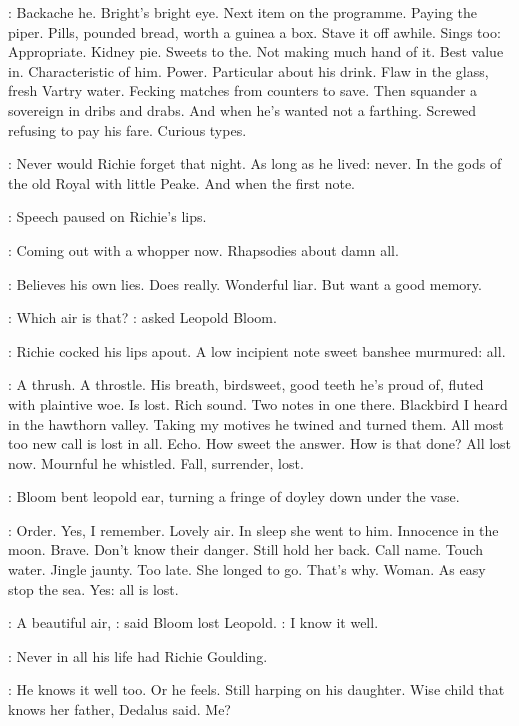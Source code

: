 \BloomInt:
Backache he.
Bright's bright eye.
Next item on the programme.
Paying the
piper.
Pills,
pounded bread,
worth a guinea a box.
Stave it off awhile.
Sings too:
Appropriate.
Kidney pie.
Sweets to
the.
Not making much hand of it.
Best value in.
Characteristic of him.
Power.
Particular about his drink.
Flaw in the glass,
fresh Vartry water.
Fecking matches from counters to save.
Then squander a sovereign in dribs
and drabs.
And when he's wanted not a farthing.
Screwed refusing to pay
his fare.
Curious types.

:
Never would Richie forget that night.
As long as he lived:
never.
In
the gods of the old Royal with little Peake.
And when the first note.

:
Speech paused on Richie's lips.

\BloomInt:
Coming out with a whopper now.
Rhapsodies about damn all.

\BloomInt:
Believes his own lies.
Does really.
Wonderful liar.
But want a good memory.

\Bloom:
Which air is that?
:
asked Leopold Bloom.


:
Richie cocked his lips apout.
A low incipient note sweet banshee murmured:
all.

\BloomInt:
A thrush.
A throstle.
His breath,
birdsweet,
good teeth he's proud of,
fluted with plaintive woe.
Is lost.
Rich sound.
Two notes in one there.
Blackbird I heard in the hawthorn valley.
Taking my motives he twined and turned them.
All most too new call is lost in all.
Echo.
How sweet the answer.
How is that done?
All lost now.
Mournful he whistled.
Fall,
surrender,
lost.

:
Bloom bent leopold ear,
turning a fringe of doyley down under the vase.

\BloomInt:
Order.
Yes,
I remember.
Lovely air.
In sleep she went to him.
Innocence in the moon.
Brave.
Don't know their danger.
Still hold her back.
Call name.
Touch water.
Jingle jaunty.
Too late.
She longed to go.
That's why.
Woman.
As easy stop the sea.
Yes:
all is lost.

\Bloom:
A beautiful air,
:
said Bloom lost Leopold.
\Bloom:
I know it well.

:
Never in all his life had Richie Goulding.

\BloomInt:
He knows it well too.
Or he feels.
Still harping on his daughter.
Wise
child that knows her father,
Dedalus said.
Me?

